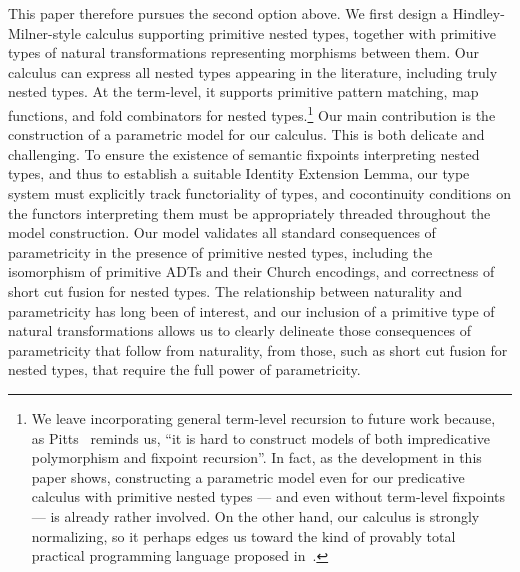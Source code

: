 \documentclass{lmcs}
\theoremstyle{plain}\newtheorem{satz}[thm]{Satz}
\begin{document}
This paper therefore pursues the second option above.  We first design
a Hindley-Milner-style calculus supporting primitive nested types,
together with primitive types of natural transformations representing
morphisms between them. Our calculus can express all nested types
appearing in the literature, including truly nested types.  At the
term-level, it supports primitive pattern matching, map functions, and
fold combinators for nested types.\footnote{We leave incorporating
  general term-level recursion to future work because, as
  Pitts~\cite{pit00} reminds us, ``it is hard to construct models of
  both impredicative polymorphism and fixpoint recursion''. In fact,
  as the development in this paper shows, constructing a parametric
  model even for our predicative calculus with primitive nested types
  --- and even without term-level fixpoints --- is already rather
  involved. On the other hand, our calculus is strongly normalizing,
  so it perhaps edges us toward the kind of provably total practical
  programming language proposed in~\cite{wad89}.}  Our main
contribution is the construction of a parametric model for our
calculus. This is both delicate and challenging. To ensure the
existence of semantic fixpoints interpreting nested types, and thus to
establish a suitable Identity Extension Lemma, our type system must
explicitly track functoriality of types, and cocontinuity conditions
on the functors interpreting them must be appropriately threaded
throughout the model construction. Our model validates all standard
consequences of parametricity in the presence of primitive nested
types, including the isomorphism of primitive ADTs and their Church
encodings, and correctness of short cut fusion for nested types. The
relationship between naturality and parametricity has long been of
interest, and our inclusion of a primitive type of natural
transformations allows us to clearly delineate those consequences of
parametricity that follow from naturality, from those, such as short
cut fusion for nested types, that require the full power of
parametricity.

\vspace*{0.1in}
\end{document}
